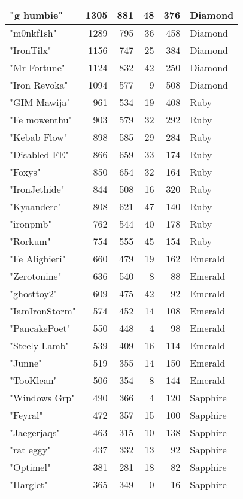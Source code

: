 \documentclass{article}
\begin{document}
\begin{table}[htbp]
\begin{tabular}{|l|r|r|r|r|l|}
"g humbie" & 1305 & 881 & 48 & 376 & Diamond \\ \hline
"m0nkf1sh" & 1289 & 795 & 36 & 458 & Diamond \\ \hline
"IronTilx" & 1156 & 747 & 25 & 384 & Diamond \\ \hline
"Mr Fortune" & 1124 & 832 & 42 & 250 & Diamond \\ \hline
"Iron Revoka" & 1094 & 577 & 9 & 508 & Diamond \\ \hline
"GIM Mawija" & 961 & 534 & 19 & 408 & Ruby \\ \hline
"Fe mowenthu" & 903 & 579 & 32 & 292 & Ruby \\ \hline
"Kebab Flow" & 898 & 585 & 29 & 284 & Ruby \\ \hline
"Disabled FE" & 866 & 659 & 33 & 174 & Ruby \\ \hline
"Foxys" & 850 & 654 & 32 & 164 & Ruby \\ \hline
"IronJethide" & 844 & 508 & 16 & 320 & Ruby \\ \hline
"Kyaandere" & 808 & 621 & 47 & 140 & Ruby \\ \hline
"ironpmb" & 762 & 544 & 40 & 178 & Ruby \\ \hline
"Rorkum" & 754 & 555 & 45 & 154 & Ruby \\ \hline
"Fe Alighieri" & 660 & 479 & 19 & 162 & Emerald \\ \hline
"Zerotonine" & 636 & 540 & 8 & 88 & Emerald \\ \hline
"ghosttoy2" & 609 & 475 & 42 & 92 & Emerald \\ \hline
"IamIronStorm" & 574 & 452 & 14 & 108 & Emerald \\ \hline
"PancakePoet" & 550 & 448 & 4 & 98 & Emerald \\ \hline
"Steely Lamb" & 539 & 409 & 16 & 114 & Emerald \\ \hline
"Junne" & 519 & 355 & 14 & 150 & Emerald \\ \hline
"TooKlean" & 506 & 354 & 8 & 144 & Emerald \\ \hline
"Windows Grp" & 490 & 366 & 4 & 120 & Sapphire \\ \hline
"Feyral" & 472 & 357 & 15 & 100 & Sapphire \\ \hline
"Jaegerjaqs" & 463 & 315 & 10 & 138 & Sapphire \\ \hline
"rat eggy" & 437 & 332 & 13 & 92 & Sapphire \\ \hline
"Optimel" & 381 & 281 & 18 & 82 & Sapphire \\ \hline
"Harglet" & 365 & 349 & 0 & 16 & Sapphire \\ \hline

\end{tabular}
\end{table}
\end{document}
